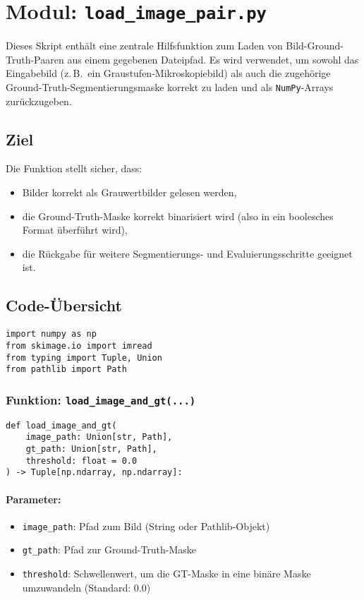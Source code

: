 \documentclass[a4paper,12pt]{article}
\begin{document}
\section{Modul: \texttt{load\_image\_pair.py}}

Dieses Skript enthält eine zentrale Hilfsfunktion zum Laden von Bild-Ground-Truth-Paaren aus einem gegebenen Dateipfad. Es wird verwendet, um sowohl das Eingabebild (z.\,B.\ ein Graustufen-Mikroskopiebild) als auch die zugehörige Ground-Truth-Segmentierungsmaske korrekt zu laden und als \texttt{NumPy}-Arrays zurückzugeben.

\subsection*{Ziel}

Die Funktion stellt sicher, dass:
\begin{itemize}
  \item Bilder korrekt als Grauwertbilder gelesen werden,
  \item die Ground-Truth-Maske korrekt binarisiert wird (also in ein boolesches Format überführt wird),
  \item die Rückgabe für weitere Segmentierungs- und Evaluierungsschritte geeignet ist.
\end{itemize}

\subsection*{Code-Übersicht}

\begin{verbatim}
import numpy as np
from skimage.io import imread
from typing import Tuple, Union
from pathlib import Path
\end{verbatim}

\subsubsection*{Funktion: \texttt{load\_image\_and\_gt(...)}}

\begin{verbatim}
def load_image_and_gt(
    image_path: Union[str, Path],
    gt_path: Union[str, Path],
    threshold: float = 0.0
) -> Tuple[np.ndarray, np.ndarray]:
\end{verbatim}

\paragraph{Parameter:}
\begin{itemize}
  \item \texttt{image\_path}: Pfad zum Bild (String oder Pathlib-Objekt)
  \item \texttt{gt\_path}: Pfad zur Ground-Truth-Maske
  \item \texttt{threshold}: Schwellenwert, um die GT-Maske in eine binäre Maske umzuwandeln (Standard: 0.0)
\end{itemize}
\end{document}
